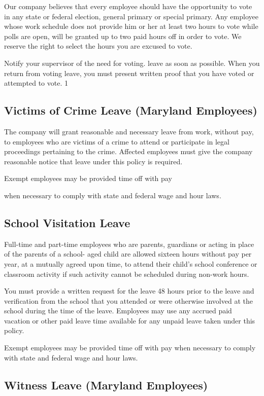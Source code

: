 Our company believes that every employee should have the opportunity to vote in any state or federal election, general primary or special primary. Any employee whose work schedule does not provide him or her at least two hours to vote while polls are open, will be granted up to two paid hours off in order to vote. We reserve the right to select the hours you are excused to vote.

Notify your supervisor of the need for voting. leave as soon as possible. When you return from voting leave, you must present written proof that you have voted or attempted to vote. 1

\subsection{Victims of Crime Leave (Maryland Employees)}

The company will grant reasonable and necessary leave from work, without pay, to employees who are victims of a crime to attend or participate in legal proceedings pertaining to the crime. Affected employees must give the company reasonable notice that leave under this policy is required.

Exempt employees may be provided time off with pay

when necessary to comply with state and federal wage and hour laws.

\subsection{School Visitation Leave}

Full-time and part-time employees who are parents, guardians or acting in place of the parents of a school- aged child are allowed sixteen hours without pay per year, at a mutually agreed upon time, to attend their child's school conference or classroom activity if such activity cannot be scheduled during non-work hours.

You must provide a written request for the leave 48 hours prior to the leave and verification from the school that you attended or were otherwise involved at the school during the time of the leave. Employees may use any accrued paid vacation or other paid leave time available for any unpaid leave taken under this policy.

Exempt employees may be provided time off with pay when necessary to comply with state and federal wage and hour laws.

\subsection{Witness Leave (Maryland Employees)}

